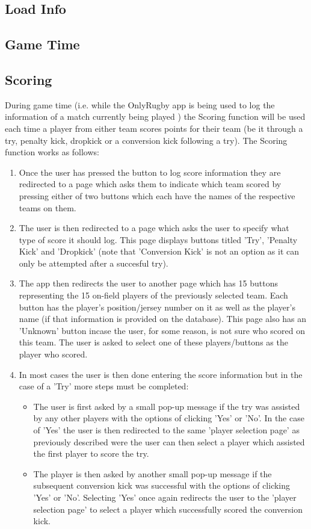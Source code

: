 \documentclass[hidelinks,a4paper,12pt]{article}
\begin{document}
	\subsection{Load Info}

	\subsection{Game Time}

	\subsection{Scoring}
		During game time (i.e. while the OnlyRugby app is being used to log the information of a match currently being played ) the Scoring function will be used each time a player from either team scores points for their team (be it through a try, penalty kick, dropkick or a conversion kick following a try). The Scoring function works as follows:
		\begin{enumerate}
			\item Once the user has pressed the button to log score information they are redirected to a page which asks them to indicate which team scored by pressing either of two buttons which each have the names of the respective teams on them.
			\item The user is then redirected to a page which asks the user to specify what type of score it should log. This page displays buttons titled 'Try', 'Penalty Kick' and  'Dropkick' (note that 'Conversion Kick' is not an option as it can only be attempted after a succesful try). 
			\item The app then redirects the user to another page which has 15 buttons representing the 15 on-field players of the previously selected team. Each button has the player's position/jersey number on it as well as the player's name (if that information is provided on the database). This page also has an 'Unknown' button incase the user, for some reason, is not sure who scored on this team. The user is asked to select one of these players/buttons as the player who scored.
			\item In most cases the user is then done entering the score information but in the case of a 'Try' more steps must be completed:
				\begin{itemize}
					\item The user is first asked by a small pop-up message if the try was assisted by any other players with the options of clicking 'Yes' or 'No'. In the case of 'Yes' the user is then redirected to the same 'player selection page' as previously described were the user can then select a player which assisted the first player to score the try.
					\item The player is then asked by another small pop-up message if the subsequent conversion kick was successful with the options of clicking 'Yes' or 'No'. Selecting 'Yes' once again redirects the user to the 'player selection page' to select a player which successfully scored the conversion kick.
				\end{itemize}
		\end{enumerate}
\end{document}
